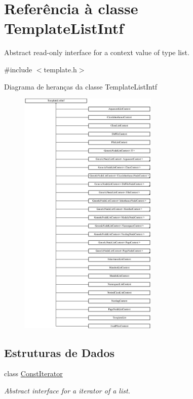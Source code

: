 \hypertarget{class_template_list_intf}{\section{Referência à classe Template\-List\-Intf}
\label{class_template_list_intf}
}


Abstract read-\/only interface for a context value of type list.  




{\ttfamily \#include $<$template.\-h$>$}

Diagrama de heranças da classe Template\-List\-Intf\begin{figure}[H]
\begin{center}
\leavevmode
\includegraphics[height=12.000000cm]{class_template_list_intf}
\end{center}
\end{figure}
\subsection*{Estruturas de Dados}
\begin{DoxyCompactItemize}
\item 
class \hyperlink{class_template_list_intf_1_1_const_iterator}{Const\-Iterator}
\begin{DoxyCompactList}\small\item\em Abstract interface for a iterator of a list. \end{DoxyCompactList}\end{DoxyCompactItemize}
